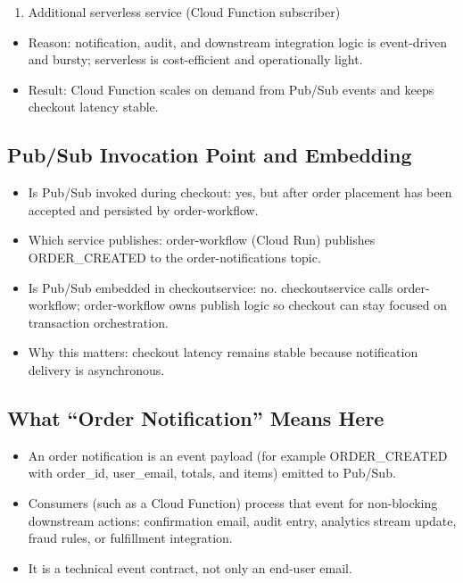 \documentclass[
]{article}
\providecommand{\tightlist}{%
  \setlength{\itemsep}{0pt}\setlength{\parskip}{0pt}}
\begin{document}
\begin{enumerate}
\def\labelenumi{\arabic{enumi}.}
\setcounter{enumi}{4}
\tightlist
\item
  Additional serverless service (Cloud Function subscriber)
\end{enumerate}

\begin{itemize}
\tightlist
\item
  Reason: notification, audit, and downstream integration logic is
  event-driven and bursty; serverless is cost-efficient and
  operationally light.
\item
  Result: Cloud Function scales on demand from Pub/Sub events and keeps
  checkout latency stable.
\end{itemize}

\subsection{Pub/Sub Invocation Point and
Embedding}\label{pubsub-invocation-point-and-embedding}

\begin{itemize}
\tightlist
\item
  Is Pub/Sub invoked during checkout: yes, but after order placement has
  been accepted and persisted by order-workflow.
\item
  Which service publishes: order-workflow (Cloud Run) publishes
  ORDER\_CREATED to the order-notifications topic.
\item
  Is Pub/Sub embedded in checkoutservice: no. checkoutservice calls
  order-workflow; order-workflow owns publish logic so checkout can stay
  focused on transaction orchestration.
\item
  Why this matters: checkout latency remains stable because notification
  delivery is asynchronous.
\end{itemize}

\subsection{What ``Order Notification'' Means
Here}\label{what-order-notification-means-here}

\begin{itemize}
\tightlist
\item
  An order notification is an event payload (for example ORDER\_CREATED
  with order\_id, user\_email, totals, and items) emitted to Pub/Sub.
\item
  Consumers (such as a Cloud Function) process that event for
  non-blocking downstream actions: confirmation email, audit entry,
  analytics stream update, fraud rules, or fulfillment integration.
\item
  It is a technical event contract, not only an end-user email.
\end{itemize}
\end{document}
